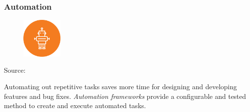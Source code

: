 \begin{frame}
  \frametitle{Automation}
  \begin{figure}[htpb]
      \centering
      \includegraphics[width=2cm]{images/robot-icon.eps}
  \end{figure}
  \begin{center}
  {\tiny Source: \cite{robot_icon}}
  \end{center}

  Automating out repetitive tasks saves more time for designing and developing features and bug fixes.
  \newline
  \newline
  {\it Automation frameworks} provide a configurable and tested method to create and execute automated tasks.

\end{frame}

